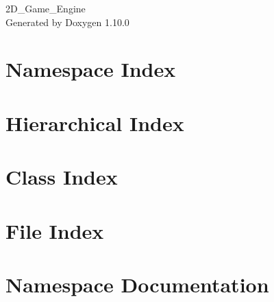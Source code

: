 \documentclass[twoside]{book}
\newcommand{\+}{\discretionary{\mbox{\scriptsize$\hookleftarrow$}}{}{}}
\newcommand{\clearemptydoublepage}{%
    \newpage{\pagestyle{empty}\cleardoublepage}%
  }
\begin{document}
  \raggedbottom
    \hypersetup{pageanchor=false,
                bookmarksnumbered=true,
                pdfencoding=unicode
               }
  \begin{titlepage}
  \vspace*{7cm}
  \begin{center}%
  {\Large 2\+D\+\_\+\+Game\+\_\+\+Engine}\\
  \vspace*{1cm}
  {\large Generated by Doxygen 1.10.0}\\
  \end{center}
  \end{titlepage}
  \clearemptydoublepage
  \tableofcontents
  \clearemptydoublepage
  \hypersetup{pageanchor=true}
\chapter{Namespace Index}

\chapter{Hierarchical Index}

\chapter{Class Index}

\chapter{File Index}

\chapter{Namespace Documentation}


\end{document}
